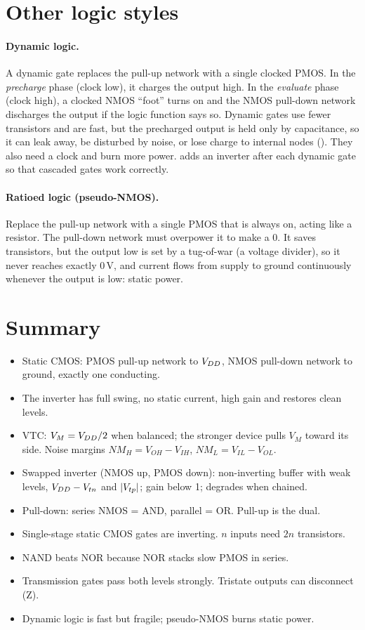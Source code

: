 \section{Other logic styles}

\paragraph{Dynamic logic.} A dynamic gate replaces the pull-up network with a single clocked PMOS. In the \emph{precharge} phase (clock low), it charges the output high. In the \emph{evaluate} phase (clock high), a clocked NMOS ``foot'' turns on and the NMOS pull-down network discharges the output if the logic function says so. Dynamic gates use fewer transistors and are fast, but the precharged output is held only by capacitance, so it can leak away, be disturbed by noise, or lose charge to internal nodes (). They also need a clock and burn more power.  adds an inverter after each dynamic gate so that cascaded gates work correctly.

\paragraph{Ratioed logic (pseudo-NMOS).} Replace the pull-up network with a single PMOS that is always on, acting like a resistor. The pull-down network must overpower it to make a 0. It saves transistors, but the output low is set by a tug-of-war (a voltage divider), so it never reaches exactly 0\,V, and current flows from supply to ground continuously whenever the output is low: static power.

\section{Summary}

\begin{itemize}
  \item Static CMOS: PMOS pull-up network to $V_{DD}$, NMOS pull-down network to ground, exactly one conducting.
  \item The inverter has full swing, no static current, high gain and restores clean levels.
  \item VTC: $V_M = V_{DD}/2$ when balanced; the stronger device pulls $V_M$ toward its side. Noise margins $NM_H = V_{OH} - V_{IH}$, $NM_L = V_{IL} - V_{OL}$.
  \item Swapped inverter (NMOS up, PMOS down): non-inverting buffer with weak levels, $V_{DD} - V_{tn}$ and $|V_{tp}|$; gain below 1; degrades when chained.
  \item Pull-down: series NMOS = AND, parallel = OR. Pull-up is the dual.
  \item Single-stage static CMOS gates are inverting. $n$ inputs need $2n$ transistors.
  \item NAND beats NOR because NOR stacks slow PMOS in series.
  \item Transmission gates pass both levels strongly. Tristate outputs can disconnect (Z).
  \item Dynamic logic is fast but fragile; pseudo-NMOS burns static power.
\end{itemize}

